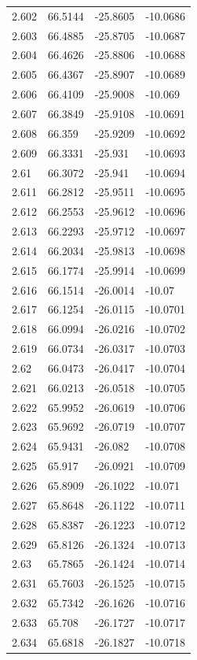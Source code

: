 \begin{tabular}{llll}
2.602 & 66.5144 & -25.8605 & -10.0686 \\
2.603 & 66.4885 & -25.8705 & -10.0687 \\
2.604 & 66.4626 & -25.8806 & -10.0688 \\
2.605 & 66.4367 & -25.8907 & -10.0689 \\
2.606 & 66.4109 & -25.9008 & -10.069 \\
2.607 & 66.3849 & -25.9108 & -10.0691 \\
2.608 & 66.359 & -25.9209 & -10.0692 \\
2.609 & 66.3331 & -25.931 & -10.0693 \\
2.61 & 66.3072 & -25.941 & -10.0694 \\
2.611 & 66.2812 & -25.9511 & -10.0695 \\
2.612 & 66.2553 & -25.9612 & -10.0696 \\
2.613 & 66.2293 & -25.9712 & -10.0697 \\
2.614 & 66.2034 & -25.9813 & -10.0698 \\
2.615 & 66.1774 & -25.9914 & -10.0699 \\
2.616 & 66.1514 & -26.0014 & -10.07 \\
2.617 & 66.1254 & -26.0115 & -10.0701 \\
2.618 & 66.0994 & -26.0216 & -10.0702 \\
2.619 & 66.0734 & -26.0317 & -10.0703 \\
2.62 & 66.0473 & -26.0417 & -10.0704 \\
2.621 & 66.0213 & -26.0518 & -10.0705 \\
2.622 & 65.9952 & -26.0619 & -10.0706 \\
2.623 & 65.9692 & -26.0719 & -10.0707 \\
2.624 & 65.9431 & -26.082 & -10.0708 \\
2.625 & 65.917 & -26.0921 & -10.0709 \\
2.626 & 65.8909 & -26.1022 & -10.071 \\
2.627 & 65.8648 & -26.1122 & -10.0711 \\
2.628 & 65.8387 & -26.1223 & -10.0712 \\
2.629 & 65.8126 & -26.1324 & -10.0713 \\
2.63 & 65.7865 & -26.1424 & -10.0714 \\
2.631 & 65.7603 & -26.1525 & -10.0715 \\
2.632 & 65.7342 & -26.1626 & -10.0716 \\
2.633 & 65.708 & -26.1727 & -10.0717 \\
2.634 & 65.6818 & -26.1827 & -10.0718 \\

\end{tabular}
